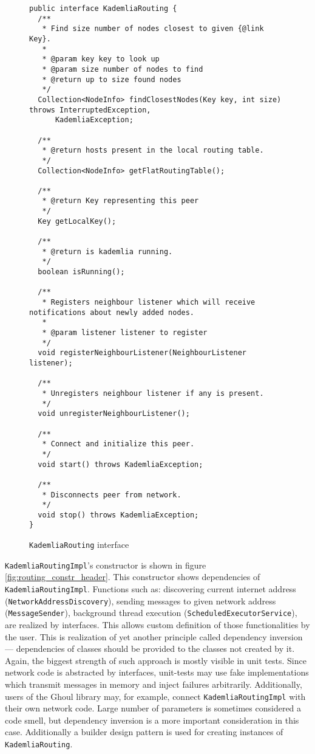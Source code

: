 \begin{figure}[tbp]
\begin{lstlisting}
public interface KademliaRouting {
  /**
   * Find size number of nodes closest to given {@link Key}.
   *
   * @param key key to look up
   * @param size number of nodes to find
   * @return up to size found nodes
   */
  Collection<NodeInfo> findClosestNodes(Key key, int size) throws InterruptedException,
      KademliaException;

  /**
   * @return hosts present in the local routing table.
   */
  Collection<NodeInfo> getFlatRoutingTable();

  /**
   * @return Key representing this peer
   */
  Key getLocalKey();

  /**
   * @return is kademlia running.
   */
  boolean isRunning();

  /**
   * Registers neighbour listener which will receive notifications about newly added nodes.
   *
   * @param listener listener to register
   */
  void registerNeighbourListener(NeighbourListener listener);

  /**
   * Unregisters neighbour listener if any is present.
   */
  void unregisterNeighbourListener();

  /**
   * Connect and initialize this peer.
   */
  void start() throws KademliaException;

  /**
   * Disconnects peer from network.
   */
  void stop() throws KademliaException;
}
\end{lstlisting}
\caption{\texttt{KademliaRouting} interface}
\label{fig:routing_interface}
\end{figure}

{\texttt{KademliaRoutingImpl}'s constructor} is shown in figure \ref{fig:routing_constr_header}.
This constructor shows dependencies of \texttt{KademliaRoutingImpl}.
Functions such as: discovering current internet address
(\texttt{NetworkAddressDiscovery}), sending messages to given network address
(\texttt{MessageSender}), background thread execution
(\texttt{ScheduledExecutorService}), are realized by interfaces.
This allows custom definition of those functionalities by the user.
This is realization of yet another principle called dependency inversion ---
dependencies of classes should be provided to the classes not created by it.
Again, the biggest strength of such approach is mostly visible in unit tests.
Since network code is abstracted by interfaces, unit-tests may use fake
implementations which transmit messages in memory and inject failures
arbitrarily.
Additionally, users of the Ghoul library may, for example, connect
\texttt{KademliaRoutingImpl} with their own network code.
Large number of parameters is sometimes considered a code smell, but dependency
inversion is a more important consideration in this case.
Additionally a builder design pattern is used for creating instances of
\texttt{KademliaRouting}.

